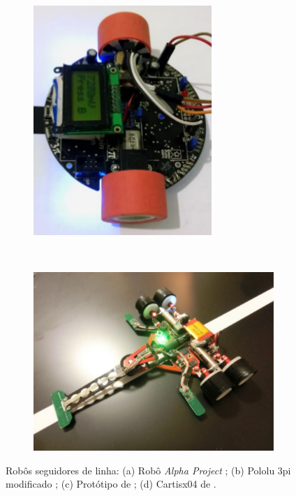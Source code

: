 \begin{figure}[h]
    \begin{subfigure}[b]{0.4\textwidth}
	\centering
        \includegraphics[width=0.75\textwidth,height=0.18\textheight]{figuras/polulumod.png}
        \caption{\centering \label{fig:pololu}}
    \end{subfigure}
    ~ %
    \begin{subfigure}[b]{0.4\textwidth}
        \includegraphics[width=\textwidth,height=0.18\textheight]{figuras/Hirai.png}
        \caption{\centering \label{fig:hirai}}
    \end{subfigure}
    
    \caption{Robôs seguidores de linha: (a) Robô \textit{Alpha Project} \cite{alemao}; 
    (b) Pololu 3pi modificado \cite{alemao}; (c) Protótipo de ; (d) Cartisx04 de .}
\end{figure}




